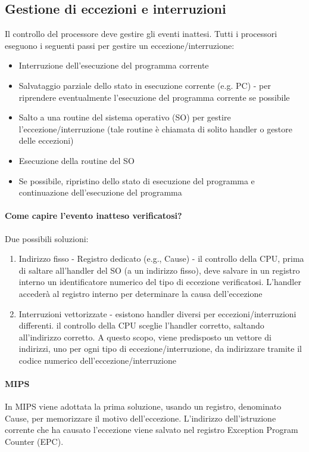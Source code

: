 \documentclass[12pt, a4paper, openany]{book}
\begin{document}
\subsection{Gestione di eccezioni e interruzioni}
Il controllo del processore deve gestire gli eventi inattesi.
Tutti i processori eseguono i seguenti passi per gestire un eccezione/interruzione:
\begin{itemize}
    \item Interruzione dell'esecuzione del programma corrente
    \item Salvataggio parziale dello stato in esecuzione corrente (e.g. PC) - per
    riprendere eventualmente l'esecuzione del programma corrente se possibile
    \item Salto a una routine del sistema operativo (SO) per gestire l'eccezione/interruzione
    (tale routine è chiamata di solito handler o gestore delle eccezioni)
    \item Esecuzione della routine del SO
    \item Se possibile, ripristino dello stato di esecuzione del programma
    e continuazione dell'esecuzione del programma
\end{itemize}
\paragraph*{Come capire l'evento inatteso verificatosi?}
Due possibili soluzioni:
\begin{enumerate}
    \item Indirizzo fisso - Registro dedicato (e.g., Cause) - il controllo della CPU,
    prima di saltare all'handler del SO (a un indirizzo fisso), deve salvare in un registro
    interno un identificatore numerico del tipo di eccezione verificatosi.
    L'handler accederà al registro interno per determinare la causa dell'eccezione
    \item Interruzioni vettorizzate - esistono handler diversi per eccezioni/interruzioni differenti.
    il controllo della CPU sceglie l'handler corretto, saltando all'indirizzo corretto.
    A questo scopo, viene predisposto un vettore di indirizzi, uno per ogni tipo
    di eccezione/interruzione, da indirizzare tramite il codice numerico dell'eccezione/interruzione
\end{enumerate}
\paragraph*{MIPS} In MIPS viene adottata la prima soluzione, usando un registro, denominato
Cause, per memorizzare il motivo dell'eccezione. L'indirizzo dell'istruzione corrente che ha causato
l'eccezione viene salvato nel registro Exception Program Counter (EPC).
\end{document}

